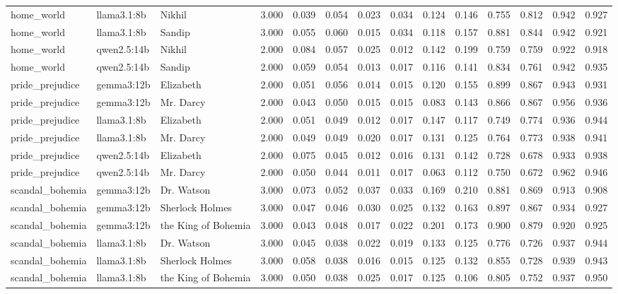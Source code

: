 \documentclass[10pt]{article}
\begin{document}
{\begin{longtable}{lllrrrrrrrrrrr}
home\_world & llama3.1:8b & Nikhil & 3.000 & 0.039 & 0.054 & 0.023 & 0.034 & 0.124 & 0.146 & 0.755 & 0.812 & 0.942 & 0.927 \\
home\_world & llama3.1:8b & Sandip & 3.000 & 0.055 & 0.060 & 0.015 & 0.034 & 0.118 & 0.157 & 0.881 & 0.844 & 0.942 & 0.921 \\
home\_world & qwen2.5:14b & Nikhil & 2.000 & 0.084 & 0.057 & 0.025 & 0.012 & 0.142 & 0.199 & 0.759 & 0.759 & 0.922 & 0.918 \\
home\_world & qwen2.5:14b & Sandip & 2.000 & 0.059 & 0.054 & 0.013 & 0.017 & 0.116 & 0.141 & 0.834 & 0.761 & 0.942 & 0.935 \\
pride\_prejudice & gemma3:12b & Elizabeth & 2.000 & 0.051 & 0.056 & 0.014 & 0.015 & 0.120 & 0.155 & 0.899 & 0.867 & 0.943 & 0.931 \\
pride\_prejudice & gemma3:12b & Mr. Darcy & 2.000 & 0.043 & 0.050 & 0.015 & 0.015 & 0.083 & 0.143 & 0.866 & 0.867 & 0.956 & 0.936 \\
pride\_prejudice & llama3.1:8b & Elizabeth & 2.000 & 0.051 & 0.049 & 0.012 & 0.017 & 0.147 & 0.117 & 0.749 & 0.774 & 0.936 & 0.944 \\
pride\_prejudice & llama3.1:8b & Mr. Darcy & 2.000 & 0.049 & 0.049 & 0.020 & 0.017 & 0.131 & 0.125 & 0.764 & 0.773 & 0.938 & 0.941 \\
pride\_prejudice & qwen2.5:14b & Elizabeth & 2.000 & 0.075 & 0.045 & 0.012 & 0.016 & 0.131 & 0.142 & 0.728 & 0.678 & 0.933 & 0.938 \\
pride\_prejudice & qwen2.5:14b & Mr. Darcy & 2.000 & 0.050 & 0.044 & 0.011 & 0.017 & 0.063 & 0.112 & 0.750 & 0.672 & 0.962 & 0.946 \\
scandal\_bohemia & gemma3:12b & Dr. Watson & 3.000 & 0.073 & 0.052 & 0.037 & 0.033 & 0.169 & 0.210 & 0.881 & 0.869 & 0.913 & 0.908 \\
scandal\_bohemia & gemma3:12b & Sherlock Holmes & 3.000 & 0.047 & 0.046 & 0.030 & 0.025 & 0.132 & 0.163 & 0.897 & 0.867 & 0.934 & 0.927 \\
scandal\_bohemia & gemma3:12b & the King of Bohemia & 3.000 & 0.043 & 0.048 & 0.017 & 0.022 & 0.201 & 0.173 & 0.900 & 0.879 & 0.920 & 0.925 \\
scandal\_bohemia & llama3.1:8b & Dr. Watson & 3.000 & 0.045 & 0.038 & 0.022 & 0.019 & 0.133 & 0.125 & 0.776 & 0.726 & 0.937 & 0.944 \\
scandal\_bohemia & llama3.1:8b & Sherlock Holmes & 3.000 & 0.058 & 0.038 & 0.016 & 0.015 & 0.125 & 0.132 & 0.855 & 0.728 & 0.939 & 0.943 \\
scandal\_bohemia & llama3.1:8b & the King of Bohemia & 3.000 & 0.050 & 0.038 & 0.025 & 0.017 & 0.125 & 0.106 & 0.805 & 0.752 & 0.937 & 0.950 \\

\end{longtable}}
\end{document}
